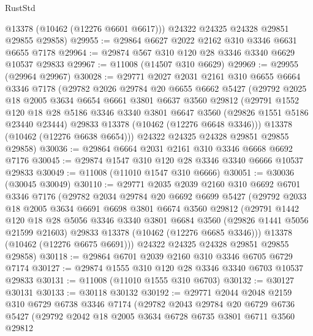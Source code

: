 \begin{lexlean}{RustStd}
\begin{coremodule}
        @13378
        (@10462 (@12276 @6601 @6617)))
      @24322
      @24325
      @24328
      @29851
      @29855
      @29858)
@29955 := @29864 @6627 @2022 @2162 @310 @3346 @6631 @6655 @7178
@29964 := @29874 @567 @310 @120 @28 @3346 @3340 @6629 @10537 @29833
@29967 := @11008 (@14507 @310 @6629)
@29969 := @29955 (@29964 @29967)
@30028 := @29771
    @2027
    @2031
    @2161
    @310
    @6655
    @6664
    @3346
    @7178
    (@29782
      @2026
      @29784
      @20
      @6655
      @6662
      @5427
      (@29792
        @2025
        @18
        @2005
        @3634
        @6654
        @6661
        @3801
        @6637
        @3560
        @29812
        (@29791
          @1552
          @120
          @18
          @28
          @5186
          @3346
          @3340
          @3801
          @6647
          @3560
          (@29826 @1551 @5186 @23440 @23444)
          @29833
          @13378
          (@10462 (@12276 @6648 @3346)))
        @13378
        (@10462 (@12276 @6638 @6654)))
      @24322
      @24325
      @24328
      @29851
      @29855
      @29858)
@30036 := @29864 @6664 @2031 @2161 @310 @3346 @6668 @6692 @7176
@30045 := @29874 @1547 @310 @120 @28 @3346 @3340 @6666 @10537 @29833
@30049 := @11008 (@11010 @1547 @310 @6666)
@30051 := @30036 (@30045 @30049)
@30110 := @29771
    @2035
    @2039
    @2160
    @310
    @6692
    @6701
    @3346
    @7176
    (@29782
      @2034
      @29784
      @20
      @6692
      @6699
      @5427
      (@29792
        @2033
        @18
        @2005
        @3634
        @6691
        @6698
        @3801
        @6674
        @3560
        @29812
        (@29791
          @1442
          @120
          @18
          @28
          @5056
          @3346
          @3340
          @3801
          @6684
          @3560
          (@29826 @1441 @5056 @21599 @21603)
          @29833
          @13378
          (@10462 (@12276 @6685 @3346)))
        @13378
        (@10462 (@12276 @6675 @6691)))
      @24322
      @24325
      @24328
      @29851
      @29855
      @29858)
@30118 := @29864 @6701 @2039 @2160 @310 @3346 @6705 @6729 @7174
@30127 := @29874 @1555 @310 @120 @28 @3346 @3340 @6703 @10537 @29833
@30131 := @11008 (@11010 @1555 @310 @6703)
@30132 := @30127 @30131
@30133 := @30118 @30132
@30192 := @29771
    @2044
    @2048
    @2159
    @310
    @6729
    @6738
    @3346
    @7174
    (@29782
      @2043
      @29784
      @20
      @6729
      @6736
      @5427
      (@29792
        @2042
        @18
        @2005
        @3634
        @6728
        @6735
        @3801
        @6711
        @3560
        @29812

\end{coremodule}
\end{lexlean}
